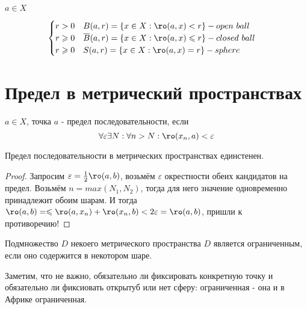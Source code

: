 \documentclass[12pt, a4paper]{article}
\begin{document}
  \begin{definition}
  [Шары]
  $a \in X$

  \begin{equation}
    \begin{cases}
      r > 0 \quad B(a, r) = \{ x \in X: \ro(a, x) < r \} - open ~ ball \\
      r \geqslant 0 \quad \overline{B}(a, r) = \{ x \in X: \ro(a, x) \leqslant r \} - closed ~ ball \\
      r \geqslant 0 \quad S(a, r) = \{ x \in X: \ro(a, x) = r \} - sphere
    \end{cases}
  \end{equation}
  \end{definition}



  \section{Предел в метрический пространствах}

  \begin{definition}
  $a \in X$, точка $a$ - предел последовательности, если 
  \begin{equation}
    \forall \varepsilon \exists N: \forall n > N: \ro(x_n, a) < \varepsilon
  \end{equation}
  \end{definition}

  \begin{theorem}
  Предел последовательности в метрических пространствах единстенен.
  \end{theorem}
  \begin{proof}
  Запросим $\varepsilon = \frac12 \ro(a, b)$, возьмём $\varepsilon$
  окрестности обеих кандидатов на предел.
  Возьмём $n = max(N_1, N_2)$, тогда для него значение одновременно принадлежит обоим шарам.
  И тогда $\ro(a, b) = \leqslant \ro(a, x_n) + \ro(x_n, b) < 2\varepsilon = \ro(a, b)$, пришли к противоречию! \contradiction
  \end{proof}

  \begin{definition}
  Подмножество $D$ некоего метрического пространства $D$ является ограниченным, если оно содержится в некотором шаре.
  \end{definition}
  \begin{note}
  Заметим, что не важно, обязательно ли фиксировать конкретную точку 
  и обязательно ли фиксиовать открытуб или нет сферу: 
  ограниченная - она и в Африке ограниченная.
  \end{note}
\end{document}
